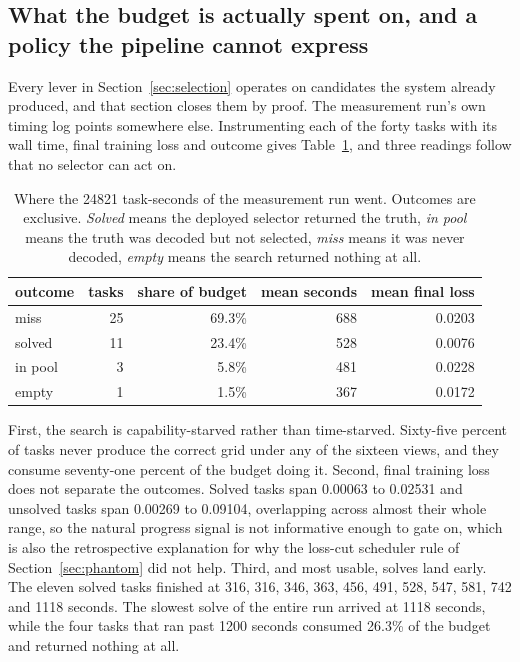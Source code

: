 \documentclass[11pt]{article}
\begin{document}
\subsection{What the budget is actually spent on, and a policy the pipeline cannot express}
\label{sec:restart}
Every lever in Section~\ref{sec:selection} operates on candidates the system already produced, and that
section closes them by proof. The measurement run's own timing log points somewhere else. Instrumenting
each of the forty tasks with its wall time, final training loss and outcome gives Table~\ref{tab:budget},
and three readings follow that no selector can act on.

\begin{table}[H]
\centering
\caption{Where the 24821 task-seconds of the measurement run went. Outcomes are exclusive. \emph{Solved}
means the deployed selector returned the truth, \emph{in pool} means the truth was decoded but not
selected, \emph{miss} means it was never decoded, \emph{empty} means the search returned nothing at all.}
\label{tab:budget}
\begin{tabular}{lrrrr}
\toprule
outcome & tasks & share of budget & mean seconds & mean final loss \\
\midrule
miss    & 25 & 69.3\% & 688 & 0.0203 \\
solved  & 11 & 23.4\% & 528 & 0.0076 \\
in pool & 3  & 5.8\%  & 481 & 0.0228 \\
empty   & 1  & 1.5\%  & 367 & 0.0172 \\
\bottomrule
\end{tabular}
\end{table}

First, the search is capability-starved rather than time-starved. Sixty-five percent of tasks never
produce the correct grid under any of the sixteen views, and they consume seventy-one percent of the
budget doing it. Second, final training loss does not separate the outcomes. Solved tasks span 0.00063
to 0.02531 and unsolved tasks span 0.00269 to 0.09104, overlapping across almost their whole range, so
the natural progress signal is not informative enough to gate on, which is also the retrospective
explanation for why the loss-cut scheduler rule of Section~\ref{sec:phantom} did not help. Third, and
most usable, solves land early. The eleven solved tasks finished at 316, 316, 346, 363, 456, 491, 528,
547, 581, 742 and 1118 seconds. The slowest solve of the entire run arrived at 1118 seconds, while the
four tasks that ran past 1200 seconds consumed 26.3\% of the budget and returned nothing at all.
\end{document}
